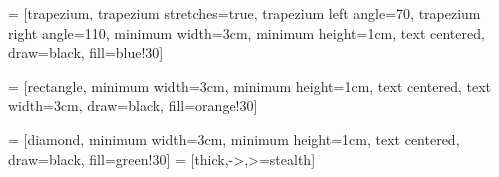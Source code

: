  = [trapezium, 
trapezium stretches=true, %
trapezium left angle=70, 
trapezium right angle=110, 
minimum width=3cm, 
minimum height=1cm, text centered, 
draw=black, fill=blue!30]

 = [rectangle, 
minimum width=3cm, 
minimum height=1cm, 
text centered, 
text width=3cm, 
draw=black, 
fill=orange!30]

 = [diamond, 
minimum width=3cm, 
minimum height=1cm, 
text centered, 
draw=black, 
fill=green!30]
 = [thick,->,>=stealth]

\setcounter{tocdepth}{6}

\makeglossaries

\newcommand{\keywords}[1]{\textit{Keywords}: #1}

\usepackage{letltxmacro}
\makeatletter
\let\oldr@@t\r@@t
\def\r@@t#1#2{%
	\setbox0=\hbox{$\oldr@@t#1{#2\,}$}\dimen0=\ht0
	\advance\dimen0-0.2\ht0
	\setbox2=\hbox{\vrule height\ht0 depth -\dimen0}%
	{\box0\lower0.4pt\box2}}
\LetLtxMacro{\oldsqrt}{\sqrt}
\renewcommand*{\sqrt}[2][\ ]{\oldsqrt[#1]{#2}}
